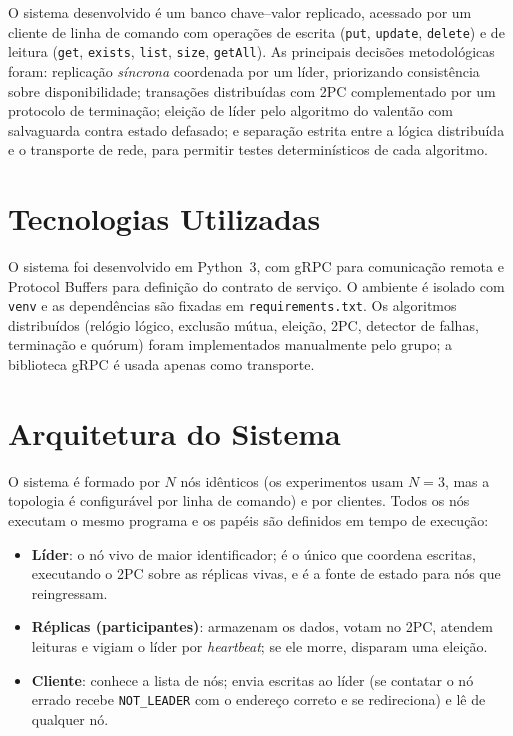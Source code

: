 \documentclass[10pt,twocolumn]{article}
\begin{document}
O sistema desenvolvido é um banco chave--valor replicado, acessado por um
cliente de linha de comando com operações de escrita (\texttt{put},
\texttt{update}, \texttt{delete}) e de leitura (\texttt{get},
\texttt{exists}, \texttt{list}, \texttt{size}, \texttt{getAll}). As
principais decisões metodológicas foram: replicação \emph{síncrona}
coordenada por um líder, priorizando consistência sobre disponibilidade;
transações distribuídas com 2PC complementado por um protocolo de
terminação; eleição de líder pelo algoritmo do valentão com salvaguarda
contra estado defasado; e separação estrita entre a lógica distribuída e o
transporte de rede, para permitir testes determinísticos de cada algoritmo.

\section{Tecnologias Utilizadas}

O sistema foi desenvolvido em Python~3, com gRPC para comunicação remota e
Protocol Buffers para definição do contrato de serviço. O ambiente é
isolado com \texttt{venv} e as dependências são fixadas em
\texttt{requirements.txt}. Os algoritmos distribuídos (relógio lógico,
exclusão mútua, eleição, 2PC, detector de falhas, terminação e quórum)
foram implementados manualmente pelo grupo; a biblioteca gRPC é usada
apenas como transporte.

\section{Arquitetura do Sistema}

O sistema é formado por $N$ nós idênticos (os experimentos usam $N=3$, mas
a topologia é configurável por linha de comando) e por clientes. Todos os
nós executam o mesmo programa e os papéis são definidos em tempo de
execução:

\begin{itemize}\itemsep2pt
  \item \textbf{Líder}: o nó vivo de maior identificador; é o único que
    coordena escritas, executando o 2PC sobre as réplicas vivas, e é a
    fonte de estado para nós que reingressam.
  \item \textbf{Réplicas (participantes)}: armazenam os dados, votam no
    2PC, atendem leituras e vigiam o líder por \emph{heartbeat}; se ele
    morre, disparam uma eleição.
  \item \textbf{Cliente}: conhece a lista de nós; envia escritas ao líder
    (se contatar o nó errado recebe \texttt{NOT\_LEADER} com o endereço
    correto e se redireciona) e lê de qualquer nó.
\end{itemize}
\end{document}
